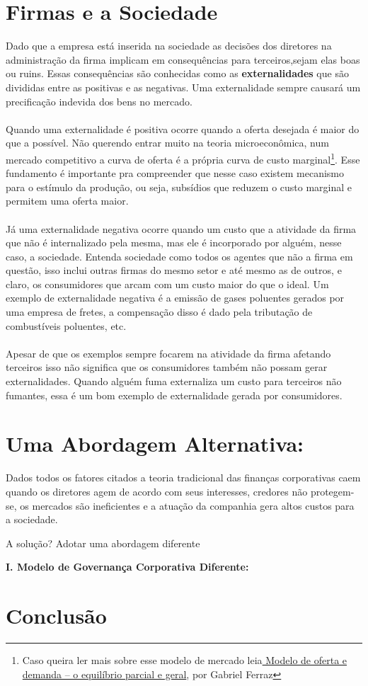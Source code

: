 \section{Firmas e a Sociedade}
Dado que a empresa está inserida na sociedade as decisões dos diretores na administração da firma implicam em consequências para terceiros,sejam elas boas ou ruins. Essas consequências são conhecidas como as \textbf{externalidades} que são divididas entre as positivas e as negativas. Uma externalidade sempre causará um precificação indevida dos bens no mercado.
\\~\\
Quando uma externalidade é positiva ocorre quando a oferta desejada é maior do que a possível. Não querendo entrar muito na teoria microeconômica, num mercado competitivo a curva de oferta é a própria curva de custo marginal\footnote{Caso queira ler mais sobre esse modelo de mercado leia\href{https://economiamainstream.com.br/artigo/modelo-de-oferta-e-demanda-o-equilibrio-parcial-e-geral/}{
Modelo de oferta e demanda – o equilíbrio parcial e geral}, por Gabriel Ferraz}. Esse fundamento é importante pra compreender que nesse caso existem mecanismo para o estímulo da produção, ou seja, subsídios que reduzem o custo marginal e permitem uma oferta maior.
\\~\\
Já uma externalidade negativa ocorre quando um custo que a atividade da firma que não é internalizado pela mesma, mas ele é incorporado por alguém, nesse caso, a sociedade. Entenda sociedade como todos os agentes que não a firma em questão, isso inclui outras firmas do mesmo setor e até mesmo as de outros, e claro, os consumidores que arcam com um custo maior do que o ideal. Um exemplo de externalidade negativa é a emissão de gases poluentes gerados por uma empresa de fretes, a compensação disso é dado pela tributação de combustíveis poluentes, etc.
\\~\\
Apesar de que os exemplos sempre focarem na atividade da firma afetando terceiros isso não significa que os consumidores também não possam gerar externalidades. Quando alguém fuma externaliza um custo para terceiros não fumantes, essa é um bom exemplo de externalidade gerada por consumidores.
\section{Uma Abordagem Alternativa:}
Dados todos os fatores citados a teoria tradicional das finanças corporativas caem quando os diretores agem de acordo com seus interesses, credores não protegem-se, os mercados são ineficientes e a atuação da companhia gera altos custos para a sociedade.

A solução? Adotar uma abordagem diferente

\textbf{I. Modelo de Governança Corporativa Diferente:} 
\section{Conclusão}
